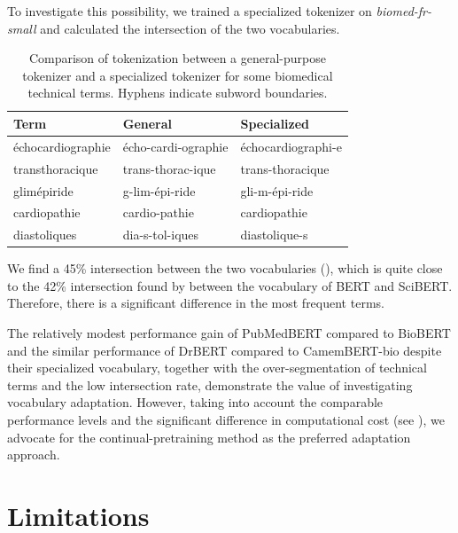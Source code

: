 \begin{reviewread}
To investigate this possibility, we trained a specialized tokenizer on \textit{biomed-fr-small} and calculated the intersection of the two vocabularies.
\end{reviewread}

\begin{table}[t]
\centering
\small
\begin{tabular}{lll}
\toprule
\textbf{Term} & \textbf{General} & \textbf{Specialized} \\
\midrule
échocardiographie & écho-cardi-ographie & échocardiographi-e \\
transthoracique   & trans-thorac-ique    & trans-thoracique \\
glimépiride       & g-lim-épi-ride       & gli-m-épi-ride \\
cardiopathie      & cardio-pathie        & cardiopathie \\
diastoliques      & dia-s-tol-iques      & diastolique-s \\
\bottomrule
\end{tabular}
\caption{Comparison of tokenization between a general-purpose tokenizer and a specialized tokenizer for some biomedical technical terms. Hyphens indicate subword boundaries.}
\label{tab:tokenization}
\end{table}

\begin{reviewread}
We find a 45\% intersection between the two vocabularies (), which is quite close to the 42\% intersection found by \citet{beltagy_scibert_2019} between the vocabulary of BERT and SciBERT. Therefore, there is a significant difference in the most frequent terms.
\end{reviewread}

\begin{reviewread}
The relatively modest performance gain of PubMedBERT compared to BioBERT and the similar performance of DrBERT compared to CamemBERT-bio despite their specialized vocabulary, together with the over-segmentation of technical terms and the low intersection rate, demonstrate the value of investigating vocabulary adaptation. However, taking into account the comparable performance levels and the significant difference in computational cost (see ), we advocate for the continual-pretraining method as the preferred adaptation approach.
\end{reviewread}


\section{Limitations}

